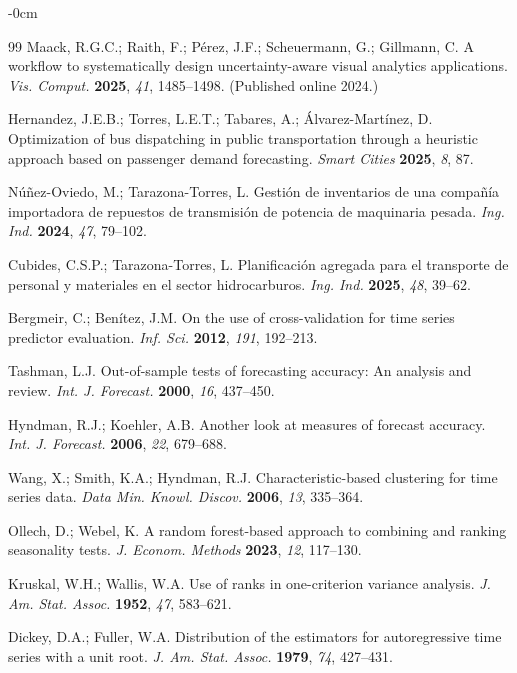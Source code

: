 \documentclass[forecasting,article,submit,pdftex,moreauthors]{Definitions/mdpi}
\begin{document}
\begin{adjustwidth}{-\extralength}{0cm}
\begin{thebibliography}{99}
Maack, R.G.C.; Raith, F.; P\'{e}rez, J.F.; Scheuermann, G.; Gillmann, C. A workflow to systematically design uncertainty-aware visual analytics applications. \textit{Vis. Comput.} \textbf{2025}, \textit{41}, 1485--1498. (Published online 2024.)

Hernandez, J.E.B.; Torres, L.E.T.; Tabares, A.; \'{A}lvarez-Mart\'{i}nez, D. Optimization of bus dispatching in public transportation through a heuristic approach based on passenger demand forecasting. \textit{Smart Cities} \textbf{2025}, \textit{8}, 87.

N\'{u}\~{n}ez-Oviedo, M.; Tarazona-Torres, L. Gesti\'{o}n de inventarios de una compa\~{n}\'{i}a importadora de repuestos de transmisi\'{o}n de potencia de maquinaria pesada. \textit{Ing. Ind.} \textbf{2024}, \textit{47}, 79--102.

Cubides, C.S.P.; Tarazona-Torres, L. Planificaci\'{o}n agregada para el transporte de personal y materiales en el sector hidrocarburos. \textit{Ing. Ind.} \textbf{2025}, \textit{48}, 39--62.

Bergmeir, C.; Ben\'{i}tez, J.M. On the use of cross-validation for time series predictor evaluation. \textit{Inf. Sci.} \textbf{2012}, \textit{191}, 192--213.

Tashman, L.J. Out-of-sample tests of forecasting accuracy: An analysis and review. \textit{Int. J. Forecast.} \textbf{2000}, \textit{16}, 437--450.

Hyndman, R.J.; Koehler, A.B. Another look at measures of forecast accuracy. \textit{Int. J. Forecast.} \textbf{2006}, \textit{22}, 679--688.

Wang, X.; Smith, K.A.; Hyndman, R.J. Characteristic-based clustering for time series data. \textit{Data Min. Knowl. Discov.} \textbf{2006}, \textit{13}, 335--364.

Ollech, D.; Webel, K. A random forest-based approach to combining and ranking seasonality tests. \textit{J. Econom. Methods} \textbf{2023}, \textit{12}, 117--130.

Kruskal, W.H.; Wallis, W.A. Use of ranks in one-criterion variance analysis. \textit{J. Am. Stat. Assoc.} \textbf{1952}, \textit{47}, 583--621.

Dickey, D.A.; Fuller, W.A. Distribution of the estimators for autoregressive time series with a unit root. \textit{J. Am. Stat. Assoc.} \textbf{1979}, \textit{74}, 427--431.


\end{thebibliography}
\end{adjustwidth}
\end{document}

